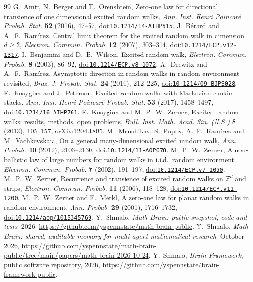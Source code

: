 \documentclass[11pt]{amsart}
\theoremstyle{remark}
\newcommand{\Z}{\mathbb{Z}}
\newcommand{\doi}[1]{\href{https://doi.org/#1}{doi:\nolinkurl{#1}}}
\begin{document}
\begin{thebibliography}{99}
 G.~Amir, N.~Berger and T.~Orenshtein, Zero-one law for directional transience of one dimensional excited
random walks, \emph{Ann. Inst. Henri Poincar\'e Probab. Stat.} \textbf{52} (2016), 47--57, \doi{10.1214/14-AIHP615}.
 J.~B\'erard and A.~F.~Ram\'irez, Central limit theorem for the excited random walk in dimension
$d\ge2$, \emph{Electron. Commun. Probab.} \textbf{12} (2007), 303--314, \doi{10.1214/ECP.v12-1317}.
 I.~Benjamini and D.~B.~Wilson, Excited random walk, \emph{Electron. Commun. Probab.} \textbf{8} (2003),
86--92, \doi{10.1214/ECP.v8-1072}.
 A.~Drewitz and A.~F.~Ram\'irez, Asymptotic direction in random walks in random environment
revisited, \emph{Braz. J. Probab. Stat.} \textbf{24} (2010), 212--225, \doi{10.1214/09-BJPS028}.
 E.~Kosygina and J.~Peterson, Excited random walks with Markovian cookie stacks, \emph{Ann. Inst. Henri
Poincar\'e Probab. Stat.} \textbf{53} (2017), 1458--1497, \doi{10.1214/16-AIHP761}.
 E.~Kosygina and M.~P.~W.~Zerner, Excited random walks: results, methods, open problems, \emph{Bull. Inst.
Math. Acad. Sin. (N.S.)} \textbf{8} (2013), 105--157, arXiv:1204.1895.
 M.~Menshikov, S.~Popov, A.~F.~Ram\'irez and M.~Vachkovskaia, On a general many-dimensional excited
random walk, \emph{Ann. Probab.} \textbf{40} (2012), 2106--2130, \doi{10.1214/11-AOP678}.
 M.~P.~W.~Zerner, A non-ballistic law of large numbers for random walks in i.i.d.\ random environment,
\emph{Electron. Commun. Probab.} \textbf{7} (2002), 191--197, \doi{10.1214/ECP.v7-1060}.
 M.~P.~W.~Zerner, Recurrence and transience of excited random walks on $\Z^d$ and strips,
\emph{Electron. Commun. Probab.} \textbf{11} (2006), 118--128, \doi{10.1214/ECP.v11-1200}.
 M.~P.~W.~Zerner and F.~Merkl, A zero-one law for planar random walks in random environment,
\emph{Ann. Probab.} \textbf{29} (2001), 1716--1732, \doi{10.1214/aop/1015345769}.
 Y.~Shmalo, \emph{Math Brain: public snapshot, code and tests}, 2026,
\url{https://github.com/yspennstate/math-brain-public}.
 Y.~Shmalo, \emph{Math Brain: shared, auditable memory for multi-agent mathematical research},
October 2026, \url{https://github.com/yspennstate/math-brain-public/tree/main/papers/math-brain-2026-10-24}.
 Y.~Shmalo, \emph{Brain Framework}, public software repository, 2026,
\url{https://github.com/yspennstate/brain-framework-public}.
\end{thebibliography}
\end{document}
